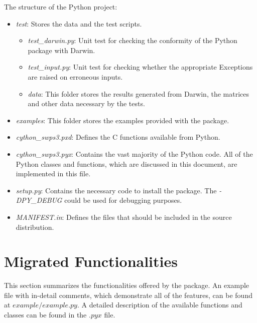 \documentclass[12pt]{article}
\begin{document}
The structure of the Python project:
\begin{itemize}
	\item \emph{test}: Stores the data and the test scripts.
	\begin{itemize}
		\item \emph{test\_darwin.py}: Unit test for checking the conformity of the Python package with Darwin.
		\item \emph{test\_input.py}: Unit test for checking whether the appropriate Exceptions are raised on erroneous inputs.
		\item \emph{data}: This folder stores the results generated from Darwin, the matrices and other data necessary by the tests.
	\end{itemize}
	\item \emph{examples}: This folder stores the examples provided with the package.
	\item \emph{cython\_swps3.pxd}: Defines the C functions available from Python.
	\item \emph{cython\_swps3.pyx}: Contains the vast majority of the Python code. All of the Python classes and functions, which are discussed in this document, are implemented in this file.
	\item \emph{setup.py}: Contains the necessary code to install the package. The \emph{-DPY\_DEBUG} could be used for debugging purposes.
	\item \emph{MANIFEST.in}: Defines the files that should be included in the source distribution.
\end{itemize}

\section{Migrated Functionalities}
This section summarizes the functionalities offered by the package. An example file with in-detail comments, which demonstrate all of the features, can be found at $example/example.py$. A detailed description of the available functions and classes can be found in the $.pyx$ file.
\end{document}

